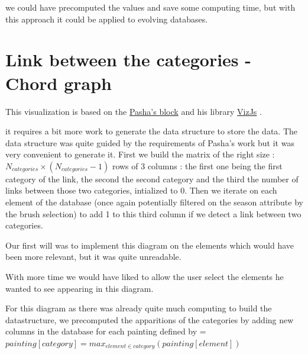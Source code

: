 \documentclass[a4paper]{tufte-book}
\begin{document}
 we could have precomputed the values and save some computing time, but with this approach it could be applied to evolving databases.

\section{Link between the categories - Chord graph}

This visualization is based on the \href{http://bl.ocks.org/NPashaP/ba4c802d5ef68f70c019a9706f77ebf1}{Pasha's block} and his library \href{https://github.com/NPashaP/Viz}{VizJs} .

 it requires a bit more work to generate the data structure to store the data. The data structure was quite guided by the requirements of Pasha's work but it was very convenient to generate it. First we build the matrix of the right size : $N_{categories} \times (N_{categories} - 1)$ rows of 3 columns : the first one being the first category of the link, the second the second category and the third the number of links between those two categories, intialized to 0. Then we iterate on each element of the database (once again potentially filtered on the season attribute by the brush selection) to add 1 to this third column if we detect a link between two categories.

Our first will was to implement this diagram on the elements which would have been more relevant, but it was quite unreadable.

With more time we would have liked to allow the user select the elements he wanted to see appearing in this diagram.

For this diagram as there was already quite much computing to build the datastructure, we precomputed the apparitions of the categories by adding new columns in the database for each painting defined by = $painting[category] = max_{element \in category}(painting[element])$



\backmatter





\printindex
\end{document}
